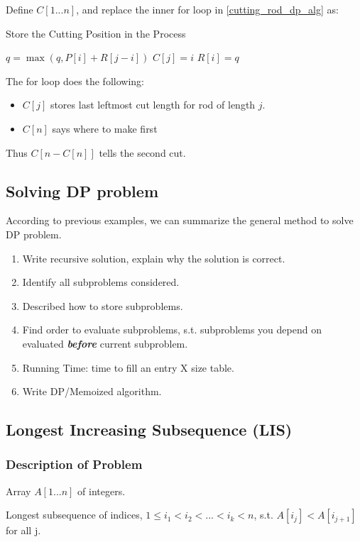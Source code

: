 Define $C[1...n]$, and replace the inner for loop in \cref{cutting_rod_dp_alg} as:
\begin{algorithm}[H]
\caption{Store the Cutting Position in the Process}
\begin{algorithmic}[1]
    \State $q = \max(q, P[i] + R[j-i])$
    \State $C[j] = i$
\EndFor
\State $R[i] = q$
\end{algorithmic}
\end{algorithm}

The for loop does the following:
\begin{itemize}
\item $C[j]$ stores last leftmost cut length for rod of length $j$.
\item $C[n]$ says where to make first
\end{itemize}

Thus $C[n - C[n]]$ tells the second cut.

\subsection{Solving DP problem}
According to previous examples, we can summarize the general method to solve DP problem.

\begin{enumerate}
\item Write recursive solution, explain why the solution is correct.
\item Identify all subproblems considered.
\item Described how to store subproblems.
\item Find order to evaluate subproblems, s.t. subproblems you depend on evaluated \textbf{\textit{before}} current subproblem.
\item Running Time: time to fill an entry X size table.
\item Write DP/Memoized algorithm.
\end{enumerate}

\subsection{Longest Increasing Subsequence (LIS)}
\subsubsection{Description of Problem}
\AlgoInput Array $A[1...n]$ of integers.

\AlgoOutput Longest subsequence of indices, $1 \leq i_1 < i_2 < ... < i_k < n$, s.t. $A[i_j] < A[i_{j+1}]$ for all j.

